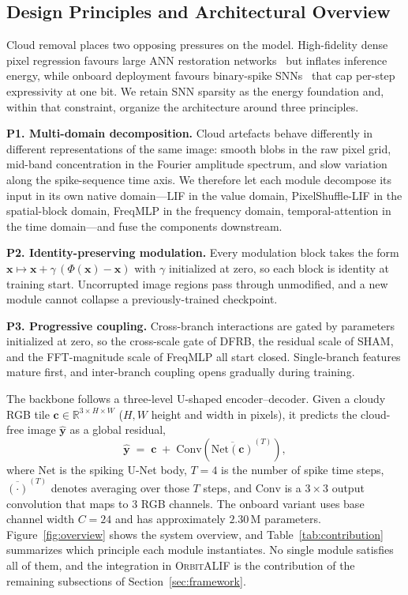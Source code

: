 \documentclass[conference]{IEEEtran}
\newcommand{\OrbitALIF}{\textsc{OrbitALIF}}
\newcommand{\DFRB}{\textsc{DFRB}}
\newcommand{\SHAM}{\textsc{SHAM}}
\begin{document}
\subsection{Design Principles and Architectural Overview}
\label{sec:framework-principles}

Cloud removal places two opposing pressures on the model.
High-fidelity dense pixel regression favours large ANN restoration
networks~\cite{ref:cuhkcr} but inflates inference energy, while
onboard deployment favours binary-spike
SNNs~\cite{ref:flsnn,ref:esdnet} that cap per-step expressivity at
one bit. We retain SNN sparsity as the energy foundation and, within
that constraint, organize the architecture around three principles.

\textbf{P1. Multi-domain decomposition.} Cloud artefacts behave
differently in different representations of the same image: smooth
blobs in the raw pixel grid, mid-band concentration in the Fourier
amplitude spectrum, and slow variation along the spike-sequence time
axis. We therefore let each module decompose its input in its own
native domain---LIF in the value domain, PixelShuffle-LIF in the
spatial-block domain, FreqMLP in the frequency domain,
temporal-attention in the time domain---and fuse the components
downstream.

\textbf{P2. Identity-preserving modulation.} Every modulation block
takes the form
$\mathbf{x}\!\mapsto\!\mathbf{x}+\gamma\,(\Phi(\mathbf{x})-\mathbf{x})$
with $\gamma$ initialized at zero, so each block is identity at
training start. Uncorrupted image regions pass through unmodified,
and a new module cannot collapse a previously-trained checkpoint.

\textbf{P3. Progressive coupling.} Cross-branch interactions are
gated by parameters initialized at zero, so the cross-scale gate
of \DFRB{}, the residual scale of \SHAM{}, and the FFT-magnitude
scale of FreqMLP all start closed. Single-branch features mature
first, and inter-branch coupling opens gradually during training.

The backbone follows a three-level U-shaped encoder--decoder.
Given a cloudy RGB tile
$\mathbf{c}\!\in\!\mathbb{R}^{3\times H\times W}$ ($H,W$ height and
width in pixels), it predicts the cloud-free image
$\hat{\mathbf{y}}$ as a global residual,
\begin{equation}
\hat{\mathbf{y}}
\;=\;
\mathbf{c}\;+\;
\mathrm{Conv}\!\left(\overline{\mathrm{Net}(\mathbf{c})}^{(T)}\right),
\label{eq:globalresidual}
\end{equation}
where $\mathrm{Net}$ is the spiking U-Net body, $T\!=\!4$ is the
number of spike time steps, $\overline{(\cdot)}^{(T)}$ denotes
averaging over those $T$ steps, and $\mathrm{Conv}$ is a
$3\!\times\!3$ output convolution that maps to $3$ RGB channels. The onboard variant
uses base channel width $C\!=\!24$ and has approximately
$2.30$\,M parameters. Figure~\ref{fig:overview} shows the system
overview, and Table~\ref{tab:contribution} summarizes which
principle each module instantiates. No single module satisfies all
of them, and the integration in \OrbitALIF{} is the contribution
of the remaining subsections of Section~\ref{sec:framework}.
\end{document}
